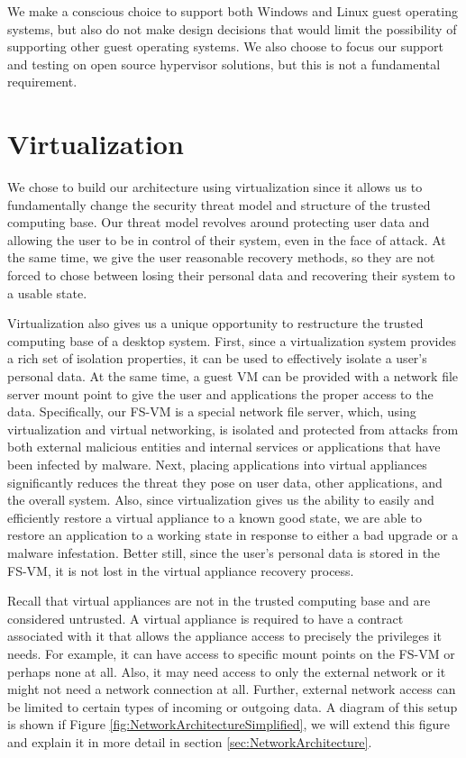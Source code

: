 We make a conscious choice to support both Windows and Linux guest operating systems, but also do not make design decisions that would limit the possibility of supporting other guest operating systems.  We also choose to focus our support and testing on open source hypervisor solutions, but this is not a fundamental requirement.

\section{Virtualization}

We chose to build our architecture using virtualization since it allows us to fundamentally change the security threat model and structure of the trusted computing base. Our threat model revolves around protecting user data and allowing the user to be in control of their system, even in the face of attack. At the same time, we give the user reasonable recovery methods, so they are not forced to chose between losing their personal data and recovering their system to a usable state.

Virtualization also gives us a unique opportunity to restructure the trusted computing base of a desktop system. First, since a virtualization system provides a rich set of isolation properties, it can be used to effectively isolate a user's personal data. At the same time, a guest VM can be provided with a network file server mount point to give the user and applications the proper access to the data. Specifically, our FS-VM is a special network file server, which, using virtualization and virtual networking, is isolated and protected from attacks from both external malicious entities and internal services or applications that have been infected by malware. Next, placing applications into virtual appliances significantly reduces the threat they pose on user data, other applications, and the overall system. Also, since virtualization gives us the ability to easily and efficiently restore a virtual appliance to a known good state, we are able to restore an application to a working state in response to either a bad upgrade or a malware infestation. Better still, since the user's personal data is stored in the FS-VM, it is not lost in the virtual appliance recovery process.

Recall that virtual appliances are not in the trusted computing base and are considered untrusted. A virtual appliance is required to have a contract associated with it that allows the appliance access to precisely the privileges it needs. For example, it can have access to specific mount points on the FS-VM or perhaps none at all. Also, it may need access to only the external network or it might not need a network connection at all. Further, external network access can be limited to certain types of incoming or outgoing data. A diagram of this setup is shown if Figure \ref{fig:NetworkArchitectureSimplified}, we will extend this figure and explain it in more detail in section \ref{sec:NetworkArchitecture}.

